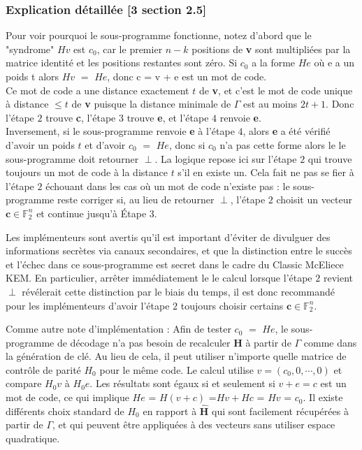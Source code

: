 \documentclass[12pt,openany]{report}
\begin{document}
\subsubsection{Explication détaillée [3 section 2.5] } 
Pour voir pourquoi le sous-programme fonctionne, notez d'abord que le "syndrome" \textbf{$Hv$} est \textbf{$c_0$}, car le premier
$ n-k $ positions de \textbf{v} sont multipliées par la matrice identité et les positions restantes sont zéro. Si \textbf{$c_0$} a la forme \textbf{$He$} où e a un poids t alors \textbf{$Hv$} $=$ \textbf{$He$}, donc c = v + e est un mot de code.\\
Ce mot de code a une distance exactement $t$ de \textbf{v}, et c'est le mot de code unique à distance $ \leq t $ de \textbf{v} puisque la distance minimale de $\Gamma $ est au moins $ 2t + 1 $. Donc l'étape $2$ trouve \textbf{c}, l'étape $3$ trouve \textbf{e}, et l'étape $4$ renvoie \textbf{e}.\\ Inversement, si le sous-programme renvoie \textbf{e} à l'étape $4$, alors \textbf{e} a été vérifié d'avoir un poids $t$ et d'avoir \textbf{$c_0$} $=$ \textbf{$He$}, donc si \textbf{$c_0$} n'a pas cette forme alors le
le sous-programme doit retourner $\perp$.
La logique repose ici sur l'étape $2$ qui trouve toujours un mot de code à la distance $t$ s'il en existe un. Cela fait
ne pas se fier à l'étape $2$ échouant dans les cas où un mot de code n'existe pas : le sous-programme reste corriger si, au lieu de retourner $\perp$, l'étape $2$ choisit un vecteur $\textbf{c}\in \mathbb{F}^n_2 $ et continue jusqu'à Étape $3$.

\begin{warningblock}
Les implémenteurs sont avertis qu'il est important d'éviter de divulguer des informations secrètes via
canaux secondaires, et que la distinction entre le succès et l'échec dans ce sous-programme est
secret dans le cadre du Classic McEliece KEM. En particulier, arrêter immédiatement le
le calcul lorsque l'étape $2$ revient $\perp$ révélerait cette distinction par le biais du temps, il est donc
recommandé pour les implémenteurs d'avoir l'étape $2$ toujours choisir certains $\textbf{c}\in \mathbb{F}^n_2 $.

\end{warningblock}

\begin{tipblock}

 Comme autre note d'implémentation : Afin de tester \textbf{$c_0$} $=$ \textbf{$He$}, le sous-programme de décodage
n'a pas besoin de recalculer \textbf{H} à partir de $ \Gamma $ comme dans la génération de clé. Au lieu de cela, il peut utiliser n'importe quelle matrice de contrôle de parité \textbf{$ H_0 $}
pour le même code. Le calcul utilise $v = (c_0,0,\cdots,0)$ et compare \textbf{$ H_0v $}  à \textbf{$ H_0e $}. Les résultats sont égaux si et seulement si $v + e = c$ est un mot de code, ce qui implique
$He$ = $H(v + c)$ =$ Hv + Hc$ = $Hv$ = $c_0$. Il existe différents choix standard de \textbf{$H_0$} en rapport à $\hat{\textbf{H}}$ qui sont facilement récupérées à partir de $\Gamma$, et qui peuvent être appliquées à des vecteurs sans utiliser espace quadratique.

\end{tipblock}
\end{document}
